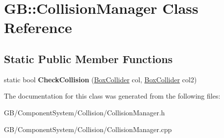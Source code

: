 \hypertarget{class_g_b_1_1_collision_manager}{}\section{GB\+::Collision\+Manager Class Reference}
\label{class_g_b_1_1_collision_manager}
\subsection*{Static Public Member Functions}
\begin{DoxyCompactItemize}
\item 
\mbox{\label{class_g_b_1_1_collision_manager_ad1f4616dcbdc757778fd6f7dcbb646fe}} 
static bool {\bfseries Check\+Collision} (\mbox{\hyperlink{struct_g_b_1_1_box_collider}{Box\+Collider}} col, \mbox{\hyperlink{struct_g_b_1_1_box_collider}{Box\+Collider}} col2)
\end{DoxyCompactItemize}


The documentation for this class was generated from the following files\+:\begin{DoxyCompactItemize}
\item 
G\+B/\+Component\+System/\+Collision/Collision\+Manager.\+h\item 
G\+B/\+Component\+System/\+Collision/Collision\+Manager.\+cpp\end{DoxyCompactItemize}
